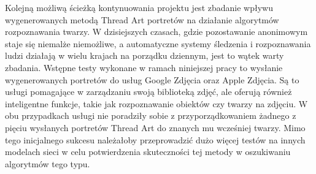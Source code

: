 \documentclass[a4paper, 12pt, polish, twoside]{extreport}
\begin{document}
    Kolejną możliwą ścieżką kontynuowania projektu jest zbadanie wpływu wygenerowanych metodą Thread Art portretów na działanie algorytmów rozpoznawania twarzy. W dzisiejszych czasach, gdzie pozostawanie anonimowym staje się niemalże niemożliwe, a automatyczne systemy śledzenia i rozpoznawania ludzi działają w wielu krajach na porządku dziennym, jest to wątek warty zbadania. Wstępne testy wykonane w ramach niniejszej pracy to wysłanie wygenerowanych portretów do usług Google Zdjęcia oraz Apple Zdjęcia. Są to usługi pomagające w zarządzaniu swoją biblioteką zdjęć, ale oferują również inteligentne funkcje, takie jak rozpoznawanie obiektów czy twarzy na zdjęciu. W obu przypadkach usługi nie poradziły sobie z przyporządkowaniem żadnego z pięciu wysłanych portretów Thread Art do znanych mu wcześniej twarzy. Mimo tego inicjalnego sukcesu należałoby przeprowadzić dużo więcej testów na innych modelach sieci w celu potwierdzenia skuteczności tej metody w oszukiwaniu algorytmów tego typu.
    
\printbibliography[heading=bibintoc,title={Bibliografia}]

\listoffigures

\listofcodes

\renewcommand{\listtablename}{Spis tabel}
\listoftables
\end{document}
